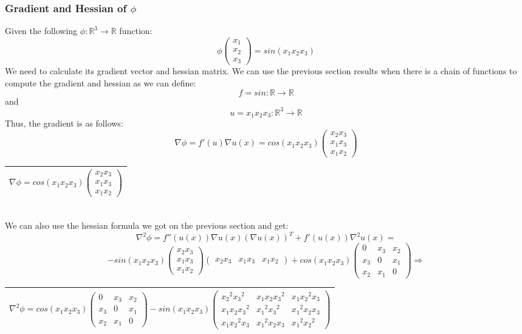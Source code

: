 \documentclass[12pt]{article}
\newcommand{\rectres}[1]{
\begin{center}
\begin{tabular}{ |c| }
\hline
 #1\\
\hline
\end{tabular}
\end{center}
}
\begin{document}
\subsubsection{Gradient and Hessian of $\phi$}
Given the following $\phi:\mathbb{R}^3\rightarrow\mathbb{R}$ function:
$$\phi \begin{pmatrix}x_1\\x_2\\x_3 \end{pmatrix} = sin(x_1x_2x_3)$$
We need to calculate its gradient vector and hessian matrix.
We can use the previous section results when there is a chain of functions to compute the gradient and hessian as we can define:
$$f=sin:\mathbb{R}\rightarrow\mathbb{R}$$ and $$u=x_1x_2x_3:\mathbb{R}^3\rightarrow\mathbb{R}$$
Thus, the gradient is as follows:
$$\nabla \phi = f'(u)\nabla u(x) = cos(x_1x_2x_3)\begin{pmatrix}x_2x_3\\x_1x_3\\x_1x_2 \end{pmatrix}$$
\rectres{$\nabla \phi = cos(x_1x_2x_3)\begin{pmatrix}x_2x_3\\x_1x_3\\x_1x_2 \end{pmatrix}$}\\
We can also use the hessian formula we got on the previous section and get:
$$\nabla^2 \phi = f''(u(x))\nabla u(x)(\nabla u(x))^T + f'(u(x))\nabla^2 u(x)=$$
$$-sin(x_1x_2x_3)\begin{pmatrix}x_2x_3\\x_1x_3\\x_1x_2 \end{pmatrix}\begin{pmatrix}x_2x_3 & x_1x_3 & x_1x_2 \end{pmatrix} + cos(x_1x_2x_3)\begin{pmatrix}0 & x_3 & x_2\\x_3 & 0 & x_1\\x_2 & x_1 & 0 \end{pmatrix} \Rightarrow$$
\rectres{$\nabla^2 \phi = cos(x_1x_2x_3)\begin{pmatrix}0 & x_3 & x_2\\x_3 & 0 & x_1\\x_2 & x_1 & 0 \end{pmatrix} -sin(x_1x_2x_3)\begin{pmatrix}{x_2}^2{x_3}^2 & x_1x_2{x_3}^2 & x_1{x_2}^2x_3\\x_1x_2{x_3}^2 & {x_1}^2{x_3}^2 & {x_1}^2x_2x_3\\x_1{x_2}^2x_3 & {x_1}^2x_2x_3 & {x_1}^2{x_2}^2 \end{pmatrix}$}
\end{document}
